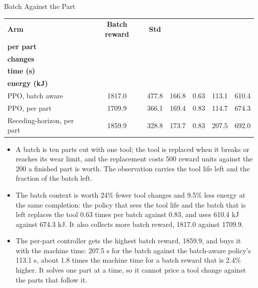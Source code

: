 \documentclass[11pt,aspectratio=169]{beamer}
\begin{document}
\begin{frame}{Batch Against the Part}
    \small
    \begin{center}
    \begin{tabular}{@{}lcccccc@{}}
    \toprule
    \textbf{Arm} & \textbf{Batch reward} & \textbf{Std} & \makecell{\textbf{Reward}\\\textbf{per part}} & \makecell{\textbf{Tool}\\\textbf{changes}} & \makecell{\textbf{Batch}\\\textbf{time (s)}} & \makecell{\textbf{Batch}\\\textbf{energy (kJ)}} \\
    \midrule
    PPO, batch aware & 1817.0 & 477.8 & 166.8 & \alert{0.63} & \alert{113.1} & \alert{610.4} \\
    PPO, per part & 1709.9 & 366.1 & 169.4 & 0.83 & 114.7 & 674.3 \\
    Receding-horizon, per part & \alert{1859.9} & 328.8 & 173.7 & 0.83 & 207.5 & 692.0 \\
    \bottomrule
    \end{tabular}
    \end{center}

    \vspace{0.4em}
    \footnotesize
    \begin{itemize}
        \item A batch is ten parts cut with one tool; the tool is replaced when it breaks or reaches
        its wear limit, and the replacement costs \alert{500 reward units against the 200 a finished
        part is worth}. The observation carries the tool life left and the fraction of the batch left.
        \item \alert{The batch context is worth 24\% fewer tool changes and 9.5\% less energy at the
        same completion}: the policy that sees the tool life and the batch that is left replaces the
        tool 0.63 times per batch against 0.83, and uses 610.4 kJ against 674.3 kJ. It also collects
        more batch reward, 1817.0 against 1709.9.
        \item The per-part controller gets the highest batch reward, 1859.9, and buys it with the
        machine time: \alert{207.5 s for the batch against the batch-aware policy's 113.1 s}, about 1.8
        times the machine time for a batch reward that is 2.4\% higher. It solves one part at a time,
        so it cannot price a tool change against the parts that follow it.
    \end{itemize}
\end{frame}
\end{document}

